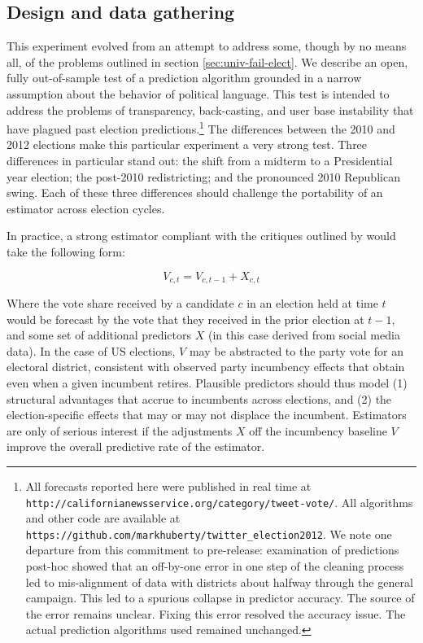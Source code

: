 \documentclass{article}
\begin{document}
\subsection{Design and data gathering}
\label{sec:design-data-gath}

This experiment evolved from an attempt to address some, though by no means
all, of the problems outlined in section \ref{sec:univ-fail-elect}. We describe an open, fully out-of-sample test
of a prediction algorithm grounded in a narrow assumption about the
behavior of political language. This test is intended to address the
problems of transparency, back-casting, and user base instability that
have plagued past election predictions.\footnote{All forecasts reported here were published in
real time at \texttt{http://californianewsservice.org/category/tweet-vote/}.  All
algorithms and other code are available at
\texttt{https://github.com/markhuberty/twitter\_election2012}. We note one departure from this commitment to
  pre-release: examination of predictions post-hoc showed that an
  off-by-one error in one step of the cleaning process led to
  mis-alignment of data with districts about halfway through the general
  campaign. This led to a spurious collapse in predictor accuracy. The
  source of the error remains unclear. Fixing this error resolved the
  accuracy issue. The actual prediction algorithms used remained
  unchanged.} 
The differences between the 2010 and 2012 elections make this
particular experiment a very strong test. Three differences in
particular stand out: the shift from a midterm to a Presidential year
election; the post-2010 redistricting; and the pronounced 2010
Republican swing. Each of these three differences should challenge the
portability of an estimator across election cycles.

In practice, a strong estimator compliant with the critiques outlined
by \cite{metaxas2011not} would take the following form:

\begin{equation}
  \label{eq:1}
  V_{c,t} = V_{c,t - 1} + X_{c,t}
\end{equation}

Where the vote share received by a candidate $c$ in an election held
at time $t$ would be forecast by the vote that they received in the
prior election at $t-1$, and some set of additional predictors $X$ (in
this case derived from social media data). In the case of US
elections, $V$ may be abstracted to the party vote for an electoral
district, consistent with observed party incumbency effects that
obtain even when a given incumbent retires. Plausible predictors
should thus model (1) structural advantages that accrue to incumbents
across elections, and (2) the election-specific effects that may or
may not displace the incumbent. Estimators are only of serious
interest if the adjustments $X$ off the incumbency baseline $V$
improve the overall predictive rate of the estimator.
\end{document}
